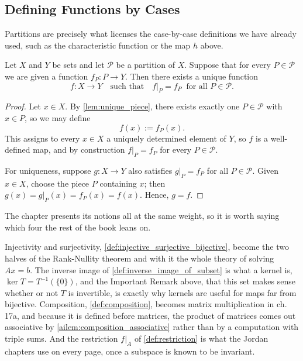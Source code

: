 \subsection{Defining Functions by Cases}

Partitions are precisely what licenses the case-by-case definitions we have already used, such as the characteristic function or the map $h$ above.

\begin{proposition}
\label{prop:defining_by_cases}
Let $X$ and $Y$ be sets and let $\mathcal{P}$ be a partition of $X$. Suppose that for every $P \in \mathcal{P}$ we are given a function $f_P: P \to Y$. Then there exists a unique function
\[
f: X \to Y \quad \text{such that} \quad f|_P = f_P \ \text{ for all } P \in \mathcal{P}.
\]
\end{proposition}

\begin{proof}
Let $x \in X$. By \cref{lem:unique_piece}, there exists exactly one $P \in \mathcal{P}$ with $x \in P$, so we may define
\[
f(x) := f_P(x).
\]
This assigns to every $x \in X$ a uniquely determined element of $Y$, so $f$ is a well-defined map, and by construction $f|_P = f_P$ for every $P \in \mathcal{P}$.

For uniqueness, suppose $g: X \to Y$ also satisfies $g|_P = f_P$ for all $P \in \mathcal{P}$. Given $x \in X$, choose the piece $P$ containing $x$; then $g(x) = g|_P(x) = f_P(x) = f(x)$. Hence, $g = f$.
\end{proof}

\begin{ainote}
The chapter presents its notions all at the same weight, so it is worth saying
which four the rest of the book leans on.

Injectivity and surjectivity, \cref{def:injective_surjective_bijective}, become
the two halves of the Rank-Nullity theorem and with it the whole theory of
solving $Ax = b$. The inverse image of \cref{def:inverse_image_of_subset} is what
a kernel is, $\ker T = T^{-1}(\{0\})$, and the Important Remark above, that this
set makes sense whether or not $T$ is invertible, is exactly why kernels are
useful for maps far from bijective. Composition,
\cref{def:composition}, becomes matrix multiplication in ch. 17a, and because it
is defined before matrices, the product of matrices comes out associative by
\cref{ailem:composition_associative} rather than by a computation with triple
sums. And the restriction $f|_A$ of \cref{def:restriction} is what the Jordan
chapters use on every page, once a subspace is known to be invariant.
\end{ainote}


